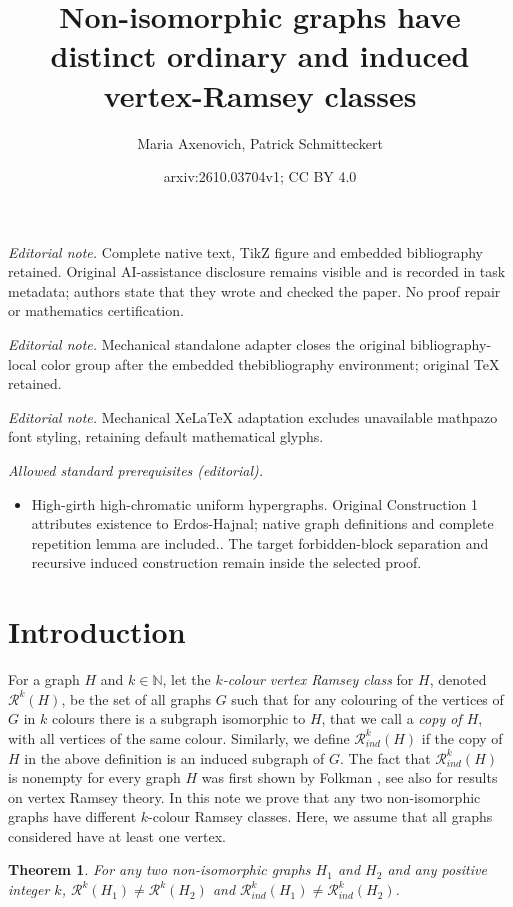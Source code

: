 \documentclass[10pt,a4paper]{article}
\title{Non-isomorphic graphs have distinct ordinary and induced vertex-Ramsey classes}
\author{Maria Axenovich, Patrick Schmitteckert}
\date{arxiv:2610.03704v1; CC BY 4.0}
\theoremstyle{plain}
\newtheorem{theorem}{Theorem}[section]
\theoremstyle{definition}
\newcommand{\R}{\mathcal{R}}
\newcommand{\bN}{\mathbb{N}}
\newcommand{\Rk}{\R_{ind}}
\begin{document}
\maketitle
\noindent\textit{Editorial note.} Complete native text, TikZ figure and embedded bibliography retained. Original AI-assistance disclosure remains visible and is recorded in task metadata; authors state that they wrote and checked the paper. No proof repair or mathematics certification.\par\medskip
\noindent\textit{Editorial note.} Mechanical standalone adapter closes the original bibliography-local color group after the embedded thebibliography environment; original TeX retained.\par\medskip
\noindent\textit{Editorial note.} Mechanical XeLaTeX adaptation excludes unavailable mathpazo font styling, retaining default mathematical glyphs.\par\medskip
\noindent\textit{Allowed standard prerequisites (editorial).}\begin{itemize}
\item High-girth high-chromatic uniform hypergraphs. Original Construction 1 attributes existence to Erdos-Hajnal; native graph definitions and complete repetition lemma are included.. The target forbidden-block separation and recursive induced construction remain inside the selected proof.
\end{itemize}\medskip
    \section{Introduction}
  For a graph $H$ and $k\in \bN$, let  the {\it $k$-colour vertex Ramsey class} for $H$, denoted $\R^k(H)$,  be the set of all graphs  $G$ such that for any colouring of the vertices of $G$ in $k$ colours there is a subgraph isomorphic to $H$, that we call a {\it copy of $H$},  with all vertices of the same colour.   Similarly, we define  $\R_{ind}^k(H)$ if the copy of $H$ in the above definition is an induced subgraph of $G$.  
  The fact that  $\Rk^k(H)$ is nonempty for every graph $H$ was first shown by Folkman \cite{Folk}, see also \cite{BR, DHKZ, LRV, NR} for results on vertex Ramsey theory. 
  In this note we prove that any two non-isomorphic graphs have different $k$-colour Ramsey classes. Here, we assume that all graphs considered   have at least one vertex.
 

 \begin{theorem}\label{main}
 For any two   non-isomorphic graphs  $H_1$ and $H_2$ and  any  positive integer $k$,   $\R^k(H_1) \neq \R^k(H_2)$ and $\R_{ind}^k(H_1) \neq \R_{ind}^k(H_2)$.
 \end{theorem}
\end{document}
